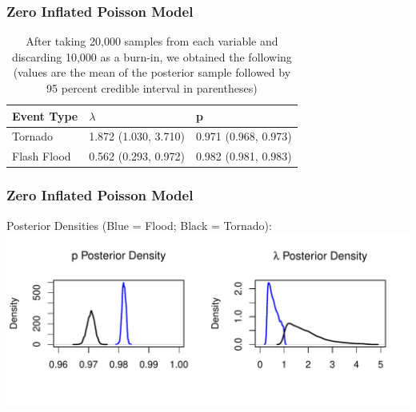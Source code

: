 \documentclass{beamer}
\begin{document}
	\begin{frame}
		\frametitle{Zero Inflated Poisson Model}
		\begin{table}
    \centering
    \caption{After taking 20,000 samples from each variable and discarding 10,000 as a burn-in, we obtained the following (values are the mean of the posterior sample followed by 95 percent credible interval in parentheses)}
    \label{t:rZIP}
    \begin{tabular}{| l | l | l |}
    \hline
    Event Type & $\lambda$ & p  \\ \hline
    Tornado & 1.872 (1.030, 3.710) & 0.971 (0.968, 0.973) \\ \hline
    Flash Flood & 0.562 (0.293, 0.972) & 0.982 (0.981, 0.983) \\ \hline
    \end{tabular}
\end{table}
	\end{frame}
	\begin{frame}
		\frametitle{Zero Inflated Poisson Model}
		Posterior Densities (Blue = Flood; Black = Tornado):
		\centering
		\includegraphics[width=.9\textwidth]{figure/ZIP_Density.pdf} 
	\end{frame}	
\end{document}
